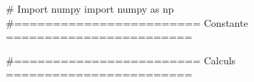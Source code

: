 \begin{pycode}
# Import numpy
import numpy as np
#======================== Constante ========================

#======================== Calculs ======================== 

\end{pycode}    